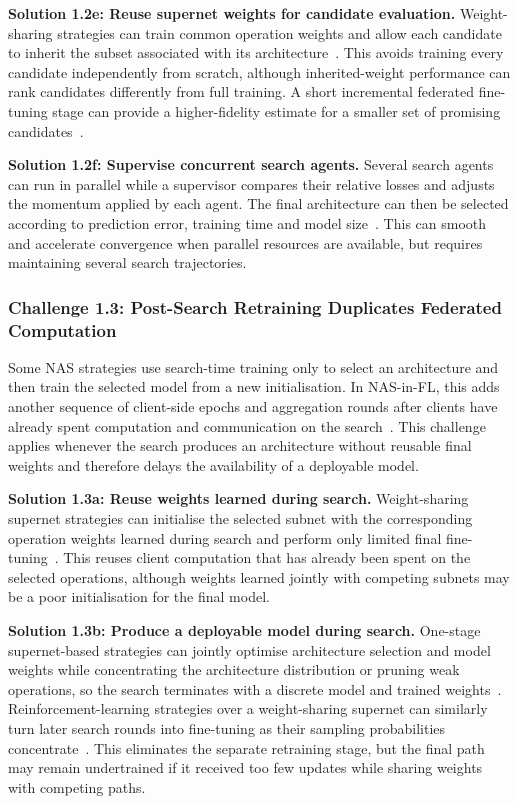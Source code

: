 \noindent\textbf{Solution 1.2e: Reuse supernet weights for candidate evaluation.} Weight-sharing strategies can train common operation weights and allow each candidate to inherit the subset associated with its architecture~\cite{fl-agnns_2023,optimize_fednas_edge_2021}. This avoids training every candidate independently from scratch, although inherited-weight performance can rank candidates differently from full training. A short incremental federated fine-tuning stage can provide a higher-fidelity estimate for a smaller set of promising candidates~\cite{medical_image_segmentation_fednas_2024}.

\noindent\textbf{Solution 1.2f: Supervise concurrent search agents.} Several search agents can run in parallel while a supervisor compares their relative losses and adjusts the momentum applied by each agent. The final architecture can then be selected according to prediction error, training time and model size~\cite{supervised_fednas_2023}. This can smooth and accelerate convergence when parallel resources are available, but requires maintaining several search trajectories.

\subsubsection{Challenge 1.3: Post-Search Retraining Duplicates Federated Computation}

Some NAS strategies use search-time training only to select an architecture and then train the selected model from a new initialisation. In NAS-in-FL, this adds another sequence of client-side epochs and aggregation rounds after clients have already spent computation and communication on the search~\cite{medical_image_segmentation_fednas_2024,privacy_preserving_fednas_for_edge_2025}. This challenge applies whenever the search produces an architecture without reusable final weights and therefore delays the availability of a deployable model.

\noindent\textbf{Solution 1.3a: Reuse weights learned during search.} Weight-sharing supernet strategies can initialise the selected subnet with the corresponding operation weights learned during search and perform only limited final fine-tuning~\cite{medical_image_segmentation_fednas_2024}. This reuses client computation that has already been spent on the selected operations, although weights learned jointly with competing subnets may be a poor initialisation for the final model.

\noindent\textbf{Solution 1.3b: Produce a deployable model during search.} One-stage supernet-based strategies can jointly optimise architecture selection and model weights while concentrating the architecture distribution or pruning weak operations, so the search terminates with a discrete model and trained weights~\cite{dfnas_2020,fed_meta_nas_2025}. Reinforcement-learning strategies over a weight-sharing supernet can similarly turn later search rounds into fine-tuning as their sampling probabilities concentrate~\cite{perfedrlnas_2024}. This eliminates the separate retraining stage, but the final path may remain undertrained if it received too few updates while sharing weights with competing paths.

